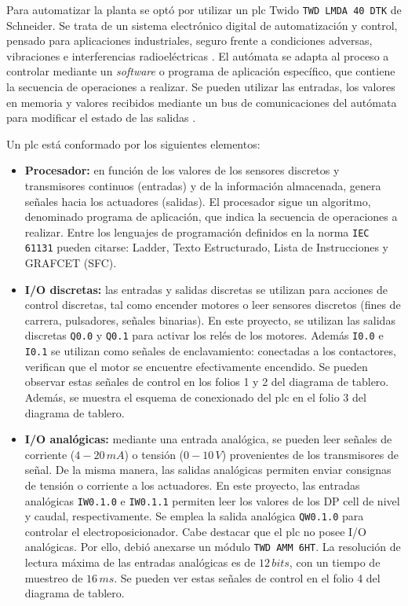 Para automatizar la planta se optó por utilizar un \gls{plc} Twido
\verb|TWD LMDA 40 DTK| de Schneider.
Se trata de un sistema electrónico digital de automatización y control, pensado
para aplicaciones industriales, seguro frente a condiciones adversas,
vibraciones e interferencias radioeléctricas \cite{bib:ApuntesJGabriel}.
El autómata se adapta al proceso a controlar mediante un
\textit{software} o programa de aplicación específico, que contiene la secuencia
de operaciones a realizar.
Se pueden utilizar las entradas, los valores en memoria y valores
recibidos mediante un bus de comunicaciones del autómata para modificar el
estado de las salidas \cite{bib:libroAutomat1}.

Un \gls{plc} está conformado por los siguientes elementos:
\begin{itemize}
 \item \textbf{Procesador:} en función de los valores de los sensores discretos
y transmisores continuos (entradas) y de la información almacenada,
genera señales hacia los
actuadores
(salidas).
El procesador sigue un algoritmo, denominado programa de aplicación,
que indica la secuencia de operaciones a realizar.
Entre los lenguajes de programación definidos en la norma \verb|IEC 61131|
pueden citarse: Ladder, Texto Estructurado, Lista de Instrucciones y GRAFCET
(SFC).
 \item \textbf{I/O discretas:} las entradas y salidas discretas se
utilizan para acciones de control discretas, tal como encender motores
o leer sensores discretos (fines de carrera, pulsadores, señales binarias).
En este proyecto, se utilizan las salidas discretas \verb|Q0.0| y \verb|Q0.1|
para activar los relés de los motores.
Además \verb|I0.0| e \verb|I0.1| se
utilizan como señales de enclavamiento: conectadas a los contactores, verifican
que el motor se encuentre efectivamente encendido.
Se pueden observar estas señales de control en los folios 1 y 2 del diagrama de
tablero.
Además, se muestra el esquema de conexionado del \gls{plc} en el folio
3 del diagrama de tablero.
\item \textbf{I/O analógicas:} mediante una entrada
analógica, se pueden leer
señales de corriente ($4-20\,mA$) o tensión ($0-10\,V$) provenientes de los
transmisores de señal.
De la misma manera, las salidas analógicas permiten enviar consignas
de tensión o corriente a los actuadores.
En este proyecto, las entradas analógicas \verb|IW0.1.0| e \verb|IW0.1.1|
permiten leer los valores de los DP cell de nivel y caudal, respectivamente.
Se emplea la salida analógica \verb|QW0.1.0| para controlar el
electroposicionador.
Cabe destacar que el \gls{plc} no posee I/O analógicas.
Por ello, debió anexarse un módulo \verb|TWD AMM 6HT|.
La resolución de lectura máxima de las entradas analógicas es de $12\,bits$,
con un tiempo de muestreo de $16\,ms$.
Se pueden ver estas señales de control en el folio 4 del diagrama de tablero.


\end{itemize}
